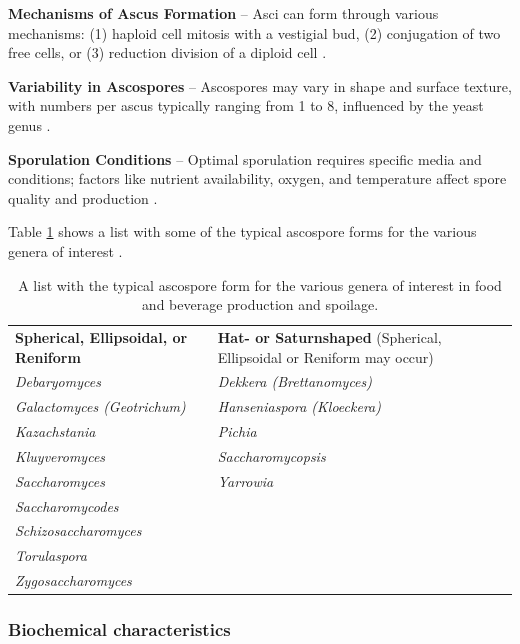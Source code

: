 \textbf{Mechanisms of Ascus Formation} – Asci can form through various mechanisms: (1) haploid cell mitosis with a vestigial bud, (2) conjugation of two free cells, or (3) reduction division of a diploid cell \cite*{L2-YeastClass}.

\textbf{Variability in Ascospores} – Ascospores may vary in shape and surface texture, with numbers per ascus typically ranging from 1 to 8, influenced by the yeast genus \cite*{L2-YeastClass}.

\textbf{Sporulation Conditions} – Optimal sporulation requires specific media and conditions; factors like nutrient availability, oxygen, and temperature affect spore quality and production \cite*{L2-YeastClass}.

Table \ref*{tab:ascosporeform} shows a list with some of the typical ascospore forms for the various genera of interest \cite*{L2-YeastClass}.

\begin{table}[h]
    \centering
    \caption{A list with the typical ascospore form for the various genera of interest in food and beverage production and spoilage.}
    \label{tab:ascosporeform}
    \begin{tabular}{p{}p{}}
        \textbf{Spherical, Ellipsoidal, or Reniform} & \textbf{Hat- or Saturnshaped} (Spherical, Ellipsoidal or Reniform may occur) \\
        \textit{Debaryomyces} & \textit{Dekkera (Brettanomyces)} \\
        \textit{Galactomyces (Geotrichum)} & \textit{Hanseniaspora (Kloeckera)} \\
        \textit{Kazachstania} & \textit{Pichia} \\
        \textit{Kluyveromyces} & \textit{Saccharomycopsis} \\
        \textit{Saccharomyces} & \textit{Yarrowia} \\
        \textit{Saccharomycodes} & \\
        \textit{Schizosaccharomyces} & \\
        \textit{Torulaspora} & \\
        \textit{Zygosaccharomyces} & \\
    \end{tabular}
\end{table}

\subsubsection{Biochemical characteristics}

